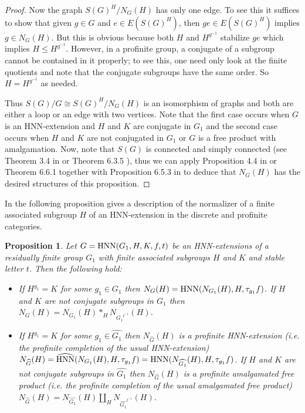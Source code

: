 \documentclass[a4paper,12pt]{article}
\newtheorem{prop}[thm]{Proposition}
\def\hnn {{\rm HNN}}
\begin{document}
{\begin{proof}
Now the graph $S(G)^{H}/N_{G}(H)$ has only one edge. To see this it suffices to show that given $g\in G$ and $e\in E(S(G)^{H})$, then $ge\in E(S(G)^{H})$ implies  $g\in N_{G}(H)$. But this is obvious because both $H$ and $H^{g^{-1}}$ stabilize $ge$  which implies $H\leq  H^{g^{-1}}.$ However, in a profinite group, a conjugate of a subgroup cannot be contained in it properly; to see this, one need only look at the finite quotients and note that the conjugate subgroups have the same order. %
So $H = H^{g^{-1}}$ as needed.

 Thus $S(G)/G \cong S(G)^{H}/N_{G}(H)$ is an isomorphism of graphs and both are either a loop or an edge with two vertices. Note that the first case occurs when $G$ is an HNN-extension and $H$ and $K$ are conjugate in $G_1$ and the second case occurs when $H$ and $K$ are not conjugated in $G_1$ or $G$ is a free product with amalgamation. Now, note that $S(G)$ is connected and simply connected (see Theorem 3.4 in \cite{ZM} or Theorem 6.3.5 \cite{R}), thus  we can apply Proposition 4.4 in \cite{ZM} or Theorem 6.6.1 together with Proposition 6.5.3 in \cite{R} to deduce that $N_{G}(H)$ has the desired structures  of this proposition.
\end{proof}

In the following proposition gives a description of the normalizer of a  finite associated subgroup $H$ of an HNN-extension in the discrete and profinite categories. 


\begin{prop}\label{cp1} 
Let $G = \hnn(G_{1}, H, K, f, t)$ be an HNN-extensions of a residually finite group $G_1$ with finite associated subgroups $H$ and $K$ and stable letter $t$. Then the following hold: \begin{itemize}

\item[(i)] If $H^{g_1}=K$ for some $g_1 \in G_1$ then $N_{G}(H)=\hnn(N_{G_1}(H), H, \tau_{g_1} f)$. 
If $H$ and $K$ are not conjugate subgroups in $G_1$ then $N_{G}(H)=N_{G_1}(H)*_{H} N_{{G_1}^{t^{-1}}}(H)$.


\item[(ii)] If $H^{g_1}=K$ for some $g_1 \in \widehat{G_1}$ then $N_{\widehat{G}}(H)$ is a profinite HNN-extension (i.e. the profinite completion of the usual HNN-extension) $N_{\widehat{G}}(H)=\widehat{\hnn}(N_{G_1}(H), H, \tau_{g_1} f)=\hnn(N_{\widehat{G_1}}(H), H, \tau_{g_1} f)$. If $H$ and $K$ are not conjugate subgroups in $\widehat{G_1}$ then $N_{\widehat{G}}(H)$ is a profinite amalgamated free product (i.e. the profinite completion of the usual amalgamated free product) $N_{\widehat{G}}(H)=N_{\widehat{G_1}}(H)\amalg_{H} N_{\widehat{G_1}^{t^{-1}}}(H)$. 
\end{itemize}
\end{prop}

}
\end{document}

